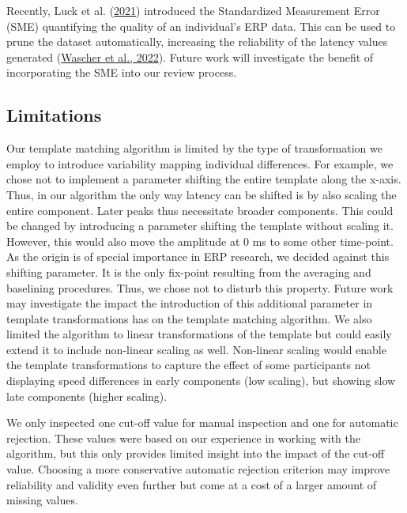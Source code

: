 \documentclass[
  man]{apa7}
\begin{document}
Recently, Luck et al. (\protect\hyperlink{ref-luck2021standardized}{2021}) introduced the Standardized Measurement Error (SME) quantifying the quality of an individual's ERP data. This can be used to prune the dataset automatically, increasing the reliability of the latency values generated (\protect\hyperlink{ref-wascher2022mental}{Wascher et al., 2022}). Future work will investigate the benefit of incorporating the SME into our review process.

\hypertarget{limitations}{%
\subsection{Limitations}\label{limitations}}

Our template matching algorithm is limited by the type of transformation we employ to introduce variability mapping individual differences. For example, we chose not to implement a parameter shifting the entire template along the x-axis. Thus, in our algorithm the only way latency can be shifted is by also scaling the entire component. Later peaks thus necessitate broader components. This could be changed by introducing a parameter shifting the template without scaling it. However, this would also move the amplitude at 0 ms to some other time-point. As the origin is of special importance in ERP research, we decided against this shifting parameter. It is the only fix-point resulting from the averaging and baselining procedures. Thus, we chose not to disturb this property. Future work may investigate the impact the introduction of this additional parameter in template transformations has on the template matching algorithm. We also limited the algorithm to linear transformations of the template but could easily extend it to include non-linear scaling as well. Non-linear scaling would enable the template transformations to capture the effect of some participants not displaying speed differences in early components (low scaling), but showing slow late components (higher scaling).

We only inspected one cut-off value for manual inspection and one for automatic rejection. These values were based on our experience in working with the algorithm, but this only provides limited insight into the impact of the cut-off value. Choosing a more conservative automatic rejection criterion may improve reliability and validity even further but come at a cost of a larger amount of missing values.
\end{document}
